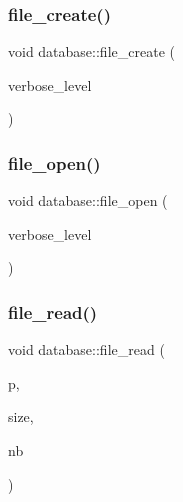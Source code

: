 \subsubsection{\texorpdfstring{file\+\_\+create()}{file\_create()}}
{\footnotesize\ttfamily void database\+::file\+\_\+create (\begin{DoxyParamCaption}\item[{\mbox{\hyperlink{galois_8h_a09fddde158a3a20bd2dcadb609de11dc}{I\+NT}}}]{verbose\+\_\+level }\end{DoxyParamCaption})}

\mbox{\label{classdatabase_a33494febd887d058f862ef6001d4a044}} 
\subsubsection{\texorpdfstring{file\+\_\+open()}{file\_open()}}
{\footnotesize\ttfamily void database\+::file\+\_\+open (\begin{DoxyParamCaption}\item[{\mbox{\hyperlink{galois_8h_a09fddde158a3a20bd2dcadb609de11dc}{I\+NT}}}]{verbose\+\_\+level }\end{DoxyParamCaption})}

\mbox{\label{classdatabase_ac743549af82d694be57c5a120987ed37}} 
\subsubsection{\texorpdfstring{file\+\_\+read()}{file\_read()}}
{\footnotesize\ttfamily void database\+::file\+\_\+read (\begin{DoxyParamCaption}\item[{void $\ast$}]{p,  }\item[{\mbox{\hyperlink{galois_8h_a09fddde158a3a20bd2dcadb609de11dc}{I\+NT}}}]{size,  }\item[{\mbox{\hyperlink{galois_8h_a09fddde158a3a20bd2dcadb609de11dc}{I\+NT}}}]{nb }\end{DoxyParamCaption})}

\mbox{\label{classdatabase_a67ff377651f4ac089241ebff60e17ed6}} 
